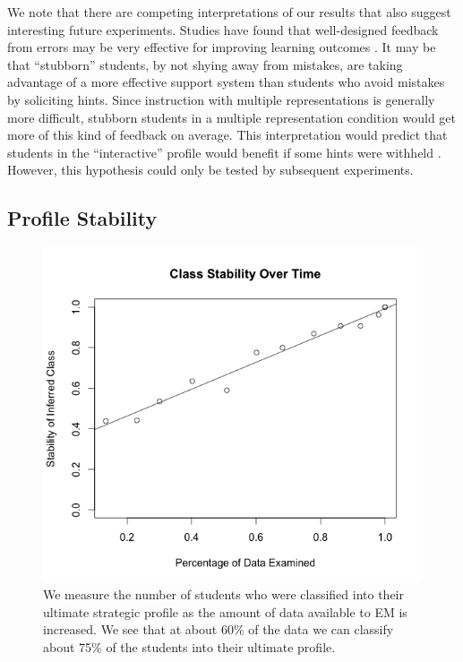 \documentclass{edm_template}
\begin{document}
We note that there are competing interpretations of our results that also suggest interesting future experiments. Studies have found that well-designed feedback from errors may be very effective for improving learning outcomes \cite{McKendree1990}. It may be that ``stubborn'' students, by not shying away from mistakes, are taking advantage of a more effective support system than students who avoid mistakes by soliciting hints. Since instruction with multiple representations is generally more difficult, stubborn students in a multiple representation condition would get more of this kind of feedback on average. This interpretation would predict that students in the ``interactive'' profile would benefit if some hints were withheld \cite{Koedinger2007}. However, this hypothesis could only be tested by subsequent experiments.

\subsection{Profile Stability}

\begin{figure}
\includegraphics[scale=.4]{class-stability.png}
\caption{We measure the number of students who were classified into their ultimate strategic profile as the amount of data available to EM is increased. We see that at about 60\% of the data we can classify about 75\% of the students into their ultimate profile.}
\label{fig:class-stability}
\end{figure}
\end{document}
